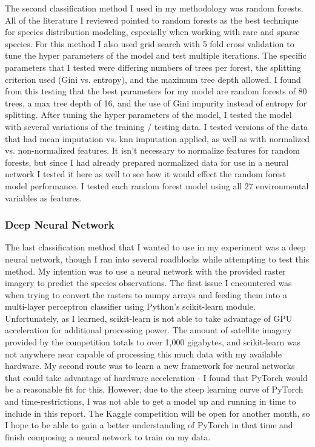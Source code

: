 \documentclass[12pt, oneside]{article}
\begin{document}
\begin{normalsize}
The second classification method I used in my methodology was random forests. All of the literature I reviewed pointed to random forests as the best technique for species distribution modeling, especially when working with rare and sparse species. For this method I also used grid search with 5 fold cross validation to tune the hyper parameters of the model and test multiple iterations. The specific parameters that I tested were differing numbers of trees per forest, the splitting criterion used (Gini vs. entropy), and the maximum tree depth allowed. I found from this testing that the best parameters for my model are random forests of 80 trees, a max tree depth of 16, and the use of Gini impurity instead of entropy for splitting. After tuning the hyper parameters of the model, I tested the model with several variations of the training / testing data. I tested versions of the data that had mean imputation vs. knn imputation applied, as well as with normalized vs. non-normalized features. It isn't necessary to normalize features for random forests,  but since I had already prepared normalized data for use in a neural network I tested it here as well to see how it would effect the random forest model performance. I tested each random forest model using all 27 environmental variables as features.

\subsubsection{Deep Neural Network}

The last classification method that I wanted to use in my experiment was a deep neural network, though I ran into several roadblocks while attempting to test this method. My intention was to use a neural network with the provided raster imagery to predict the species observations. The first issue I encountered was when trying to convert the rasters to numpy arrays and feeding them into a multi-layer perceptron classifier using Python's scikit-learn module. Unfortunately, as I learned, scikit-learn is not able to take advantage of GPU acceleration for additional processing power. The amount of satellite imagery provided by the competition totals to over 1,000 gigabytes, and scikit-learn was not anywhere near capable of processing this much data with my available hardware. My second route was to learn a new framework for neural networks that could take advantage of hardware acceleration - I found that PyTorch would be a reasonable fit for this. However, due to the steep learning curve of PyTorch and time-restrictions, I was not able to get a model up and running in time to include in this report. The Kaggle competition will be open for another month, so I hope to be able to gain a better understanding of PyTorch in that time and finish composing a neural network to train on my data. 

\end{normalsize}
\end{document}
